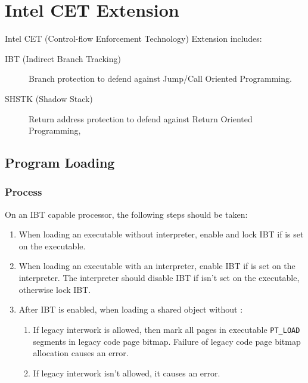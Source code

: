 \chapter{Intel CET Extension}

Intel CET (Control-flow Enforcement Technology) Extension includes:

\begin{description}
  \item[IBT (Indirect Branch Tracking)] Branch protection to defend
    against Jump/Call Oriented Programming.
  \item [SHSTK (Shadow Stack)] Return address protection to defend
    against Return Oriented Programming,
\end{description}

\section{Program Loading}

\subsection{Process }
\label{ibt}

On an IBT capable processor, the following steps should be taken:

\begin{enumerate}
  \item
    When loading an executable without interpreter, enable and lock
    IBT if  is set on the
    executable.
  \item
    \begin{sloppypar}
      When loading an executable with an interpreter, enable IBT if
       is set on the interpreter.
      The interpreter should disable IBT if
       isn't set on the executable,
      otherwise lock IBT.
    \end{sloppypar}
  \item
    \begin{sloppypar}
      After IBT is enabled, when loading a shared object without
      :
   \end{sloppypar}
   \begin{enumerate}
    \item If legacy interwork is allowed, then mark all pages in
      executable \texttt{PT_LOAD} segments in legacy code page bitmap.
      Failure of legacy code page bitmap allocation causes an error.
    \item If legacy interwork isn't allowed, it causes an error.
   \end{enumerate}
\end{enumerate}

